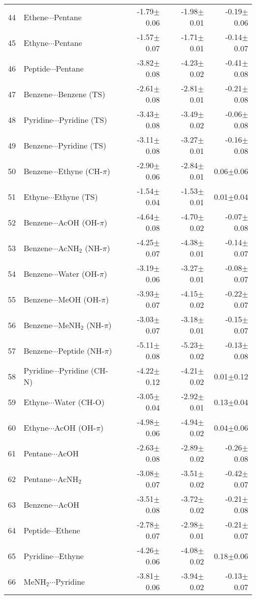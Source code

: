 \begin{longtable}{llrrr}
44 & Ethene$\cdots$Pentane & -1.79$\pm$0.06 & -1.98$\pm$0.01 & -0.19$\pm$0.06  \\
45 & Ethyne$\cdots$Pentane & -1.57$\pm$0.07 & -1.71$\pm$0.01 & -0.14$\pm$0.07  \\
46 & Peptide$\cdots$Pentane & -3.82$\pm$0.08 & -4.23$\pm$0.02 & -0.41$\pm$0.08  \\
47 & Benzene$\cdots$Benzene (TS) & -2.61$\pm$0.08 & -2.81$\pm$0.01 & -0.21$\pm$0.08  \\
48 & Pyridine$\cdots$Pyridine (TS) & -3.43$\pm$0.08 & -3.49$\pm$0.02 & -0.06$\pm$0.08  \\
49 & Benzene$\cdots$Pyridine (TS) & -3.11$\pm$0.08 & -3.27$\pm$0.01 & -0.16$\pm$0.08  \\
50 & Benzene$\cdots$Ethyne (CH-$\pi$) & -2.90$\pm$0.06 & -2.84$\pm$0.01 & 0.06$\pm$0.06  \\
51 & Ethyne$\cdots$Ethyne (TS) & -1.54$\pm$0.04 & -1.53$\pm$0.01 & 0.01$\pm$0.04  \\
52 & Benzene$\cdots$AcOH (OH-$\pi$) & -4.64$\pm$0.08 & -4.70$\pm$0.02 & -0.07$\pm$0.08  \\
53 & Benzene$\cdots$AcNH$_2$ (NH-$\pi$) & -4.25$\pm$0.07 & -4.38$\pm$0.01 & -0.14$\pm$0.07  \\
54 & Benzene$\cdots$Water (OH-$\pi$) & -3.19$\pm$0.06 & -3.27$\pm$0.01 & -0.08$\pm$0.07  \\
55 & Benzene$\cdots$MeOH (OH-$\pi$) & -3.93$\pm$0.07 & -4.15$\pm$0.02 & -0.22$\pm$0.07  \\
56 & Benzene$\cdots$MeNH$_2$ (NH-$\pi$) & -3.03$\pm$0.07 & -3.18$\pm$0.01 & -0.15$\pm$0.07  \\
57 & Benzene$\cdots$Peptide (NH-$\pi$) & -5.11$\pm$0.08 & -5.23$\pm$0.02 & -0.13$\pm$0.08  \\
58 & Pyridine$\cdots$Pyridine (CH-N) & -4.22$\pm$0.12 & -4.21$\pm$0.02 & 0.01$\pm$0.12  \\
59 & Ethyne$\cdots$Water (CH-O) & -3.05$\pm$0.04 & -2.92$\pm$0.01 & 0.13$\pm$0.04  \\
60 & Ethyne$\cdots$AcOH (OH-$\pi$) & -4.98$\pm$0.06 & -4.94$\pm$0.02 & 0.04$\pm$0.06  \\
61 & Pentane$\cdots$AcOH & -2.63$\pm$0.08 & -2.89$\pm$0.02 & -0.26$\pm$0.08  \\
62 & Pentane$\cdots$AcNH$_2$ & -3.08$\pm$0.07 & -3.51$\pm$0.02 & -0.42$\pm$0.07  \\
63 & Benzene$\cdots$AcOH & -3.51$\pm$0.08 & -3.72$\pm$0.02 & -0.21$\pm$0.08  \\
64 & Peptide$\cdots$Ethene & -2.78$\pm$0.07 & -2.98$\pm$0.01 & -0.21$\pm$0.07  \\
65 & Pyridine$\cdots$Ethyne & -4.26$\pm$0.06 & -4.08$\pm$0.02 & 0.18$\pm$0.06  \\
66 & MeNH$_2$$\cdots$Pyridine & -3.81$\pm$0.06 & -3.94$\pm$0.02 & -0.13$\pm$0.07  \\
\end{longtable}\normalsize